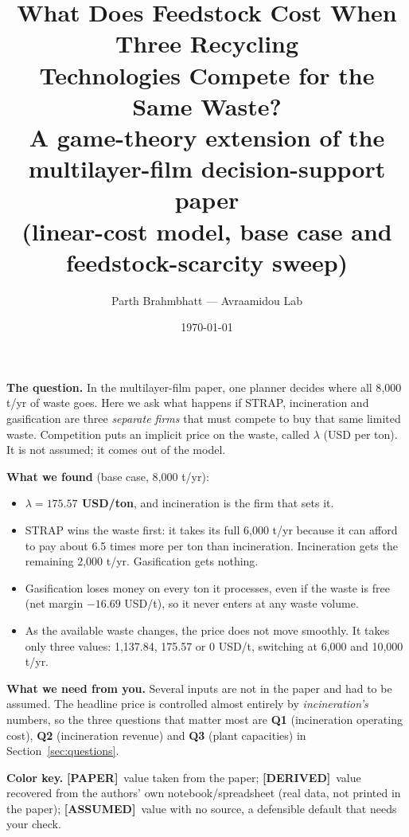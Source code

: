 \documentclass[11pt]{article}
\title{\textbf{What Does Feedstock Cost When Three Recycling\\
Technologies Compete for the Same Waste?}\\[0.4em]
\large A game-theory extension of the multilayer-film decision-support paper\\
(linear-cost model, base case and feedstock-scarcity sweep)}
\author{Parth Brahmbhatt --- Avraamidou Lab}
\date{\today}
\newcommand{\FROMPAPER}{\textcolor{papercolor}{\textbf{[PAPER]}}}
\newcommand{\DERIVED}{\textcolor{derivedcolor}{\textbf{[DERIVED]}}}
\newcommand{\ASSUMED}{\textcolor{assumedcolor}{\textbf{[ASSUMED]}}}
\newcommand{\usd}{USD}
\begin{document}
\maketitle

\begin{keybox}[title={The short version}]
\textbf{The question.} In the multilayer-film paper, one planner decides where
all 8{,}000 t/yr of waste goes. Here we ask what happens if STRAP,
incineration and gasification are three \emph{separate firms} that must compete
to buy that same limited waste. Competition puts an implicit price on the waste,
called $\lambda$ (USD per ton). It is not assumed; it comes out of the model.

\textbf{What we found} (base case, 8{,}000 t/yr):
\begin{itemize}[leftmargin=1.4em,itemsep=0.2em,topsep=0.2em]
  \item \textbf{$\lambda = 175.57$ \usd/ton}, and incineration is the firm that sets it.
  \item STRAP wins the waste first: it takes its full 6{,}000 t/yr because it can
        afford to pay about 6.5 times more per ton than incineration.
        Incineration gets the remaining 2{,}000 t/yr. Gasification gets nothing.
  \item Gasification loses money on every ton it processes, even if the waste is
        free (net margin $-16.69$ \usd/t), so it never enters at any waste volume.
  \item As the available waste changes, the price does not move smoothly. It
        takes only three values: 1{,}137.84, 175.57 or 0 \usd/t, switching at
        6{,}000 and 10{,}000 t/yr.
\end{itemize}

\textbf{What we need from you.} Several inputs are not in the paper and had to
be assumed. The headline price is controlled almost entirely by
\emph{incineration's} numbers, so the three questions that matter most are
\textbf{Q1} (incineration operating cost), \textbf{Q2} (incineration revenue) and
\textbf{Q3} (plant capacities) in Section~\ref{sec:questions}.
\end{keybox}

\vspace{0.4em}
\noindent\textbf{Color key.}
\FROMPAPER\ value taken from the paper;
\DERIVED\ value recovered from the authors' own notebook/spreadsheet (real data,
not printed in the paper);
\ASSUMED\ value with no source, a defensible default that needs your check.
\end{document}
